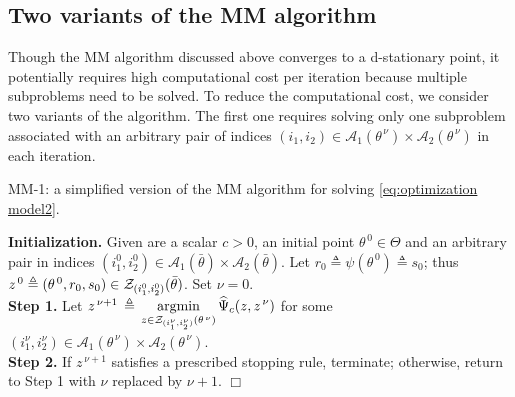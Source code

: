 \documentclass{siamart}
\newcommand{\wh}{\widehat}
\begin{document}
\subsection{Two variants of the MM algorithm}

Though the MM algorithm discussed above converges to a d-stationary point, it potentially requires high computational cost
per iteration because multiple subproblems need to be solved.  To reduce the computational cost, we consider two variants of
the algorithm. The first one requires solving only one subproblem associated with an arbitrary pair of
indices $(i_1, i_2)\in \mathcal{A}_1(\theta^{\,\nu})\times \mathcal{A}_2(\theta^{\,\nu})$ in each iteration.


\vskip 0.2cm
\noindent\makebox[\linewidth]{\rule{\textwidth}{1pt}}
\noindent
MM-1: a simplified version of the MM algorithm for solving \eqref{eq:optimization model2}.\\
\noindent\makebox[\linewidth]{\rule{\textwidth}{1pt}}

\noindent
{\bf Initialization.}  Given are a scalar $c > 0$, an initial point $\theta^{\, 0} \in \Theta$ and an arbitrary
pair in indices $( i_1^0, i_2^0  )\in \mathcal{A}_1( \bar{\theta} ) \times \mathcal{A}_2( \bar{\theta} )$.  Let
$r_0 \triangleq \psi( \theta^{\, 0} ) \triangleq s_0$; thus
$z^{\, 0} \triangleq ( \theta^{\, 0}, r_0, s_0 ) \in {\cal Z}_{(i_1^0,i_2^0)}( \bar{\theta} )$.  Set $\nu = 0$.\\[0.05in]
{\bf Step 1.}  Let
$z^{\, \nu+1} \,\triangleq \, \displaystyle{
\operatornamewithlimits{\mbox{argmin}}_{z \in {\cal Z}_{(i_1^{\nu},i_2^{\nu})}(\theta^{\, \nu})}
} \, \wh{\Psi}_c(z,z^{\, \nu})$ for some $(i_1^\nu, i_2^\nu)\in \mathcal{A}_1(\theta^{\,\nu})\times \mathcal{A}_2(\theta^{\,\nu})$.\\[0.05in]
{\bf Step 2.} If $z^{\, \nu+1}$ satisfies a prescribed stopping rule, terminate; otherwise, return to Step 1 with $\nu$ replaced by $\nu+1$.
\hfill $\Box$

\noindent\makebox[\linewidth]{\rule{\textwidth}{1pt}}
\vskip 0.2cm
\end{document}
